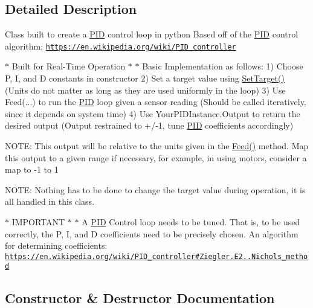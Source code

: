 \subsection{Detailed Description}
Class built to create a \hyperlink{class_robotics_library_1_1_controllers_1_1_p_i_d}{P\+ID} control loop in python Based off of the \hyperlink{class_robotics_library_1_1_controllers_1_1_p_i_d}{P\+ID} control algorithm\+: \href{https://en.wikipedia.org/wiki/PID_controller}{\tt https\+://en.\+wikipedia.\+org/wiki/\+P\+I\+D\+\_\+controller} 


\begin{DoxyItemize}
\item $\ast$ Built for Real-\/\+Time Operation $\ast$ $\ast$ Basic Implementation as follows\+: 1) Choose P, I, and D constants in constructor 2) Set a target value using {\ttfamily \hyperlink{class_robotics_library_1_1_controllers_1_1_p_i_d_aa4d528cb3b0adef1dfe42879319fcbb5}{Set\+Target()}} (Units do not matter as long as they are used uniformly in the loop) 3) Use {\ttfamily Feed(...)} to run the \hyperlink{class_robotics_library_1_1_controllers_1_1_p_i_d}{P\+ID} loop given a sensor reading (Should be called iteratively, since it depends on system time) 4) Use {\ttfamily Your\+P\+I\+D\+Instance.\+Output} to return the desired output (Output restrained to +/-\/1, tune \hyperlink{class_robotics_library_1_1_controllers_1_1_p_i_d}{P\+ID} coefficients accordingly)
\item N\+O\+TE\+: This output will be relative to the units given in the \hyperlink{class_robotics_library_1_1_controllers_1_1_p_i_d_a933cc736e6142b6ff531c33243c35549}{Feed()} method. Map this output to a given range if necessary, for example, in using motors, consider a map to -\/1 to 1
\item N\+O\+TE\+: Nothing has to be done to change the target value during operation, it is all handled in this class.
\item $\ast$ I\+M\+P\+O\+R\+T\+A\+NT $\ast$ $\ast$ A \hyperlink{class_robotics_library_1_1_controllers_1_1_p_i_d}{P\+ID} Control loop needs to be tuned. That is, to be used correctly, the P, I, and D coefficients need to be precisely chosen. An algorithm for determining coefficients\+: \href{https://en.wikipedia.org/wiki/PID_controller#Ziegler.E2.80.93Nichols_method}{\tt https\+://en.\+wikipedia.\+org/wiki/\+P\+I\+D\+\_\+controller\#\+Ziegler.\+E2..\+Nichols\+\_\+method} 
\end{DoxyItemize}

\subsection{Constructor \& Destructor Documentation}
\mbox{\label{class_robotics_library_1_1_controllers_1_1_p_i_d_a2b61da609180184fe7a40cba5d8d7cbf}} 

